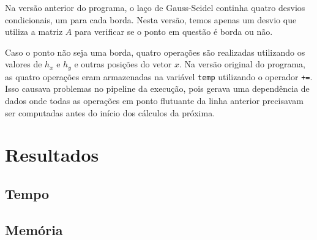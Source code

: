 \documentclass[12pt]{article}
\begin{document}
	Na versão anterior do programa, o laço de Gauss-Seidel continha quatro desvios condicionais, um para cada borda.
	Nesta versão, temos apenas um desvio que utiliza a matriz $A$ para verificar se o ponto em questão é borda ou não.
	
	Caso o ponto não seja uma borda, quatro operações são realizadas utilizando os valores de $h_x$ e $h_y$ e outras posições do vetor $x$.
	Na versão original do programa, as quatro operações eram armazenadas na variável \texttt{temp} utilizando o operador \texttt{+=}.
	Isso causava problemas no pipeline da execução, pois gerava uma dependência de dados onde todas as operações em ponto flutuante da linha anterior precisavam ser computadas antes do início dos cálculos da próxima.

\newpage

\section{Resultados}

\subsection{Tempo}

\subsection{Memória}

\newpage
\end{document}
